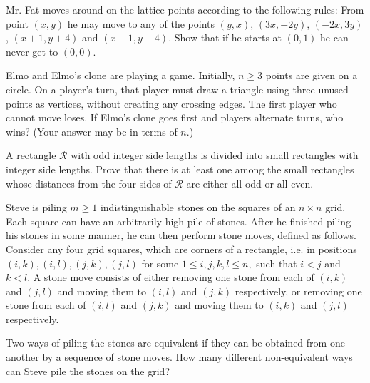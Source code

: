 \documentclass[mast]{lucky}
\begin{document}
\begin{prob}[ELMO 1999/2]{3}
Mr. Fat moves around on the lattice points according to the following rules: From point $(x,y)$ he may move to any of the points $(y,x)$, $(3x,-2y)$, $(-2x,3y)$, $(x+1,y+4)$ and $(x-1,y-4)$. Show that if he starts at $(0,1)$ he can never get to $(0,0)$.
\end{prob}


\begin{req}[ELMO SL 2019/C1]{3}
Elmo and Elmo's clone are playing a game. Initially, $n\geq 3$ points are given on a circle. On a player's turn, that player must draw a triangle using three unused points as vertices, without creating any crossing edges. The first player who cannot move loses. If Elmo's clone goes first and players alternate turns, who wins? (Your answer may be in terms of $n$.)
\end{req}


\begin{prob}[ISL 2017/C1]{6}
A rectangle $\mathcal{R}$ with odd integer side lengths is divided into small rectangles with integer side lengths. Prove that there is at least one among the small rectangles whose distances from the four sides of $\mathcal{R}$ are either all odd or all even.
\end{prob}

\begin{prob}[USAMO 2015/4]{13}
Steve is piling $m \geq 1$ indistinguishable stones on the squares of an $n \times n$ grid. Each square can have an arbitrarily high pile of stones. After he finished piling his stones in some manner, he can then perform stone moves, defined as follows. Consider any four grid squares, which are corners of a rectangle, i.e. in positions $(i, k),(i, l),(j, k),(j, l)$ for some $1 \leq i, j, k, l \leq n,$ such that $i<j$ and $k<l .$ A stone move consists of either removing one stone from each of $(i, k)$ and $(j, l)$ and moving them to $(i, l)$ and $(j, k)$ respectively, or removing one stone from each of $(i, l)$ and $(j, k)$ and moving them to $(i, k)$ and $(j, l)$ respectively.

Two ways of piling the stones are equivalent if they can be obtained from one another by a sequence of stone moves. How many different non-equivalent ways can Steve pile the stones on the grid?
\end{prob} 
\end{document}
